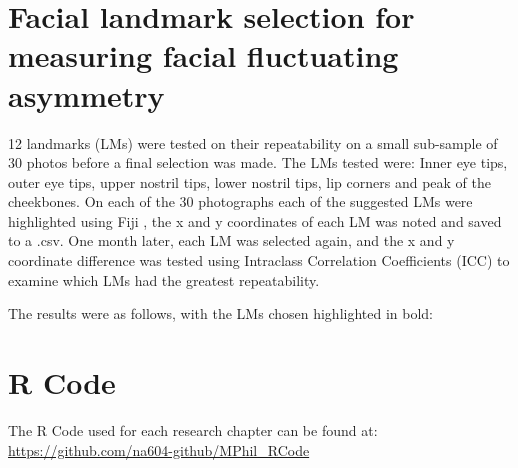 \section{Facial landmark selection for measuring facial fluctuating asymmetry}
12 landmarks (LMs) were tested on their repeatability on a small sub-sample of 30 photos before a final selection was made. The LMs tested were: Inner eye tips, outer eye tips, upper nostril tips, lower nostril tips, lip corners and peak of the cheekbones. On each of the 30 photographs each of the suggested LMs were highlighted using Fiji , the x and y coordinates of each LM was noted and saved to a .csv. One month later, each LM was selected again, and the x and y coordinate difference was tested using Intraclass Correlation Coefficients (ICC) to examine which LMs had the greatest repeatability. 

The results were as follows, with the LMs chosen highlighted in bold:

\begin{table}[h!]
    \centering
\end{table}


\section{R Code}

The R Code used for each research chapter can be found at: \href{https://github.com/na604-github/MPhil_RCode}{
https://github.com/na604-github/MPhil\_RCode} 


